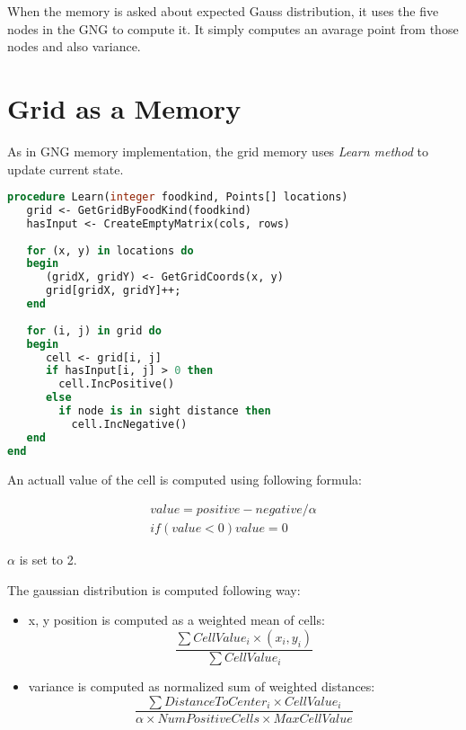 When the memory is asked about expected Gauss distribution, it uses the five nodes in the GNG to compute it. It simply computes an avarage point from those nodes and also variance.

\section{Grid as a Memory}
\label{sec:gridasmemory}

As in GNG memory implementation, the grid memory uses \emph{Learn method} to update current state. 

\begin{lstlisting}[language=Pascal]
procedure Learn(integer foodkind, Points[] locations)
   grid <- GetGridByFoodKind(foodkind)
   hasInput <- CreateEmptyMatrix(cols, rows)
   
   for (x, y) in locations do
   begin
      (gridX, gridY) <- GetGridCoords(x, y)
      grid[gridX, gridY]++;
   end 
   
   for (i, j) in grid do
   begin
      cell <- grid[i, j]
      if hasInput[i, j] > 0 then
        cell.IncPositive()
      else
        if node is in sight distance then
          cell.IncNegative()
   end
end
\end{lstlisting}  

An actuall value of the cell is computed using following formula:

\begin{equation}        
\begin{split}
value = positive - negative / \alpha  \\
if (value < 0) value = 0 
\end{split}
\end{equation}  

$\alpha$ is set to 2.

The gaussian distribution is computed following way:

\begin{itemize}
\item x, y position is computed as a weighted mean of cells: 
\begin{equation}
  \frac{\sum{CellValue_i\times (x_i,y_i)}}{\sum{CellValue_i}}
\end{equation}
\item variance is computed as normalized sum of weighted distances:
\begin{equation}
\frac{\sum{DistanceToCenter_i\times CellValue_i}}{\alpha\times NumPositiveCells\times MaxCellValue}
\end{equation}
\end{itemize}








                                    